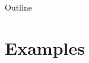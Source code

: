 \documentclass{beamer}
\begin{document}
\begin{frame}
    \titlepage
\end{frame}

\begin{frame}{Outline}
    \tableofcontents
\end{frame}

\section{Examples}

\begin{frame}
    
\end{frame}
\end{document}
